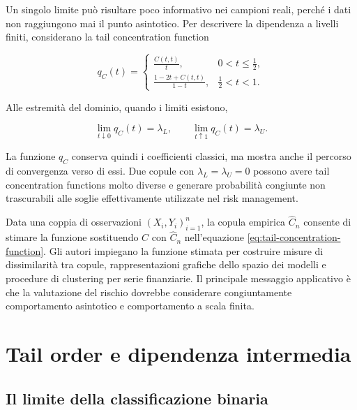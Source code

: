 Un singolo limite può risultare poco informativo nei campioni reali, perché i
dati non raggiungono mai il punto asintotico. Per descrivere la dipendenza a
livelli finiti, \textcite{duranteEtAl2015} considerano la tail concentration
function

\begin{equation}
    q_C(t)=
    \begin{cases}
        \displaystyle \frac{C(t,t)}{t},
        & 0<t\leq \tfrac{1}{2},\\[8pt]
        \displaystyle \frac{1-2t+C(t,t)}{1-t},
        & \tfrac{1}{2}<t<1.
    \end{cases}
    \label{eq:tail-concentration-function}
\end{equation}

Alle estremità del dominio, quando i limiti esistono,

\begin{equation}
    \lim_{t\downarrow 0}q_C(t)=\lambda_L,
    \qquad
    \lim_{t\uparrow 1}q_C(t)=\lambda_U.
\end{equation}

La funzione $q_C$ conserva quindi i coefficienti classici, ma mostra anche il
percorso di convergenza verso di essi. Due copule con
$\lambda_L=\lambda_U=0$ possono avere tail concentration functions molto
diverse e generare probabilità congiunte non trascurabili alle soglie
effettivamente utilizzate nel risk management.

Data una coppia di osservazioni $(X_i,Y_i)_{i=1}^n$, la copula empirica
$\widehat C_n$ consente di stimare la funzione sostituendo $C$ con
$\widehat C_n$ nell'equazione \eqref{eq:tail-concentration-function}. Gli
autori impiegano la funzione stimata per costruire misure di dissimilarità tra
copule, rappresentazioni grafiche dello spazio dei modelli e procedure di
clustering per serie finanziarie. Il principale messaggio applicativo è che
la valutazione del rischio dovrebbe considerare congiuntamente comportamento
asintotico e comportamento a scala finita.

\section{Tail order e dipendenza intermedia}

\subsection{Il limite della classificazione binaria}

